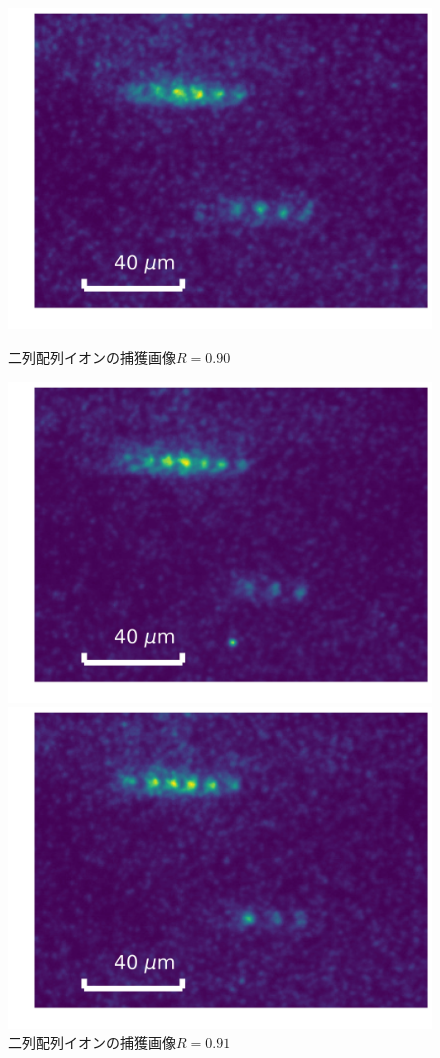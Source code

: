 \begin{figure}[h]
	\begin{minipage}{0.33\linewidth}
		\begin{center}
			\includegraphics[width = 0.8\columnwidth]{./results/figure/2D_090.jpg}
			\caption{二列配列イオンの捕獲画像$R = 0.90$}
			\label{fig:2D_090}
		\end{center}
	\end{minipage}
	\begin{minipage}{0.33\linewidth}
		\begin{center}
			\includegraphics[width = 0.8\columnwidth]{./results/figure/2D_091_0.jpg}
			\caption{二列配列イオンの捕獲画像$R = 0.91$}
			\label{fig:2D_091}
		\end{center}
	\end{minipage}
	\begin{minipage}{0.33\linewidth}
		\begin{center}
			\includegraphics[width = 0.8\columnwidth]{./results/figure/2D_091_1.jpg}

\end{center}
\end{minipage}
\end{figure}
